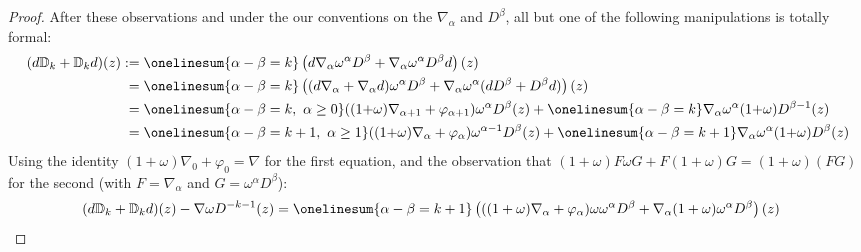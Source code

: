 \documentclass[11pt]{amsart}
\theoremstyle{plain}
\theoremstyle{definition}
\let\phi\varphi
\theoremstyle{plain}
\newcommand{\twist}{\omega}
\newcommand{\Nabla}{\nabla}
\begin{document}
\begin{second quadrant homotopy}
\begin{proof}
After these observations and under the our conventions on the $\Nabla_\alpha$ and $D^\beta$, all but one of the following manipulations is totally formal:%
%
\begin{alignat*}{2}
(d\mathbb{D}_k+\mathbb{D}_kd)(z)
:={}&
\onelinesum{\alpha-\beta=k}\left(d\Nabla_\alpha\twist^\alpha D^\beta+\Nabla_\alpha\twist^\alpha D^\beta d\right)(z)%
\\
={}&
\onelinesum{\alpha-\beta=k}\left((d\Nabla_\alpha+
\Nabla_\alpha d)\twist^\alpha D^\beta+
\Nabla_\alpha\twist^\alpha (dD^\beta+
D^\beta d)\right)(z)%
\\
={}&
\onelinesum{\alpha-\beta=k,\ \alpha\geq0}((1{+}\twist)\Nabla_{\alpha+1}+\phi_{\alpha+1})\twist^\alpha D^\beta(z)+ \onelinesum{\alpha-\beta=k} \Nabla_\alpha\twist^\alpha(1{+}\twist) D^{\beta-1}(z)%
\\
={}&
\onelinesum{\alpha-\beta=k+1,\ \alpha\geq1}((1{+}\twist)\Nabla_{\alpha}+\phi_{\alpha})\twist^{\alpha-1} D^\beta(z)+ \onelinesum{\alpha-\beta=k+1} \Nabla_\alpha\twist^\alpha(1{+}\twist) D^{\beta}(z)%
\end{alignat*}
Using the identity $(1+\twist)\Nabla_{0}+\phi_{0}=\Nabla$ for the first equation, and the observation that $(1+\twist)F\twist G+F(1+\twist)G=(1+\twist)(FG)$  for the second (with $F=\Nabla_\alpha$ and $G=\twist^\alpha D^\beta$):
\begin{alignat*}{2}
(d\mathbb{D}_k+\mathbb{D}_kd)(z)-\Nabla\twist D^{-k-1}(z)
&=
\onelinesum{\alpha-\beta=k+1} \left(((1+\twist)\Nabla_{\alpha}+ \phi_{\alpha})\twist\twist^{\alpha} D^\beta+\Nabla_\alpha(1+\twist)\twist^{\alpha}D^{\beta}\right)(z)%

\end{alignat*}
\end{proof}
\end{second quadrant homotopy}
\end{document}
